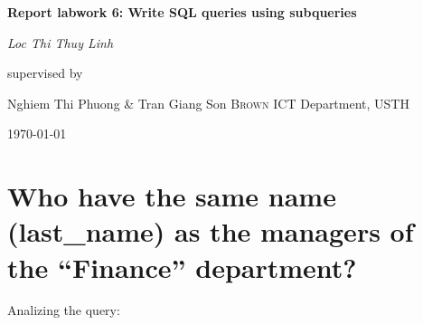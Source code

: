 \documentclass[13pt,a4paper]{report}
\begin{document}
\begin{titlepage}
	\centering
	\vspace{2cm}
	{\huge\bfseries Report labwork 6: Write SQL queries using subqueries \par}
	\vspace{2cm}
	{\Large\itshape Loc Thi Thuy Linh\par}
	\vfill
	supervised by\par
	Nghiem Thi Phuong \& Tran Giang Son \textsc{Brown}
	ICT Department, USTH\par
	\vfill
	{\large \today\par}
\end{titlepage}

\section{ Who have the same name (last_name) as the managers of the “Finance” department? }
Analizing the query:
\\
\end{document}
